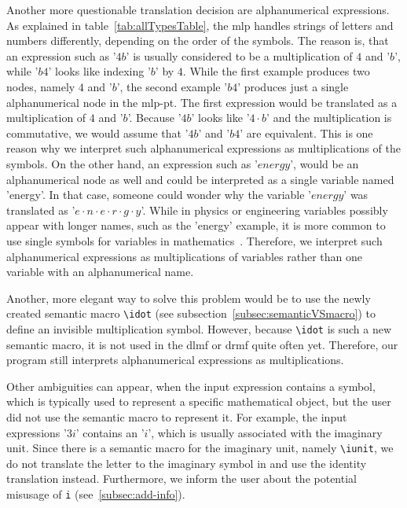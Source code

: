 Another more questionable translation decision are alphanumerical expressions. As explained in table~\ref{tab:allTypesTable}, the \gls{mlp} handles strings of letters and numbers differently, depending on the order of the symbols. The reason is, that an expression such as '$4b$' is usually considered to be a multiplication of $4$ and '$b$', while '$b4$' looks like indexing '$b$' by $4$. While the first example produces two nodes, namely $4$ and '$b$', the second example '$b4$' produces just a single alphanumerical node in the \gls{mlp-pt}. The first expression would be translated as a multiplication of $4$ and '$b$'. Because '$4b$' looks like '$4 \cdot b$' and the multiplication is commutative, we would assume that '$4b$' and '$b4$' are equivalent. This is one reason why we interpret such alphanumerical expressions as multiplications of the symbols. On the other hand, an expression such as '$energy$', would be an alphanumerical node as well and could be interpreted as a single variable named 'energy'. In that case, someone could wonder why the variable '$energy$' was translated as '$e \cdot n \cdot e \cdot r \cdot g \cdot y$'. While in physics or engineering variables possibly appear with longer names, such as the 'energy' example, it is more common to use single symbols for variables in mathematics~\parencite{Notation:History}. Therefore, we interpret such alphanumerical expressions as multiplications of variables rather than one variable with an alphanumerical name.

Another, more elegant way to solve this problem would be to use the newly created semantic macro \verb|\idot| (see subsection~\ref{subsec:semanticVSmacro}) to define an invisible multiplication symbol. However, because \verb|\idot| is such a new semantic macro, it is not used in the \gls{dlmf} or \gls{drmf} quite often yet. Therefore, our program still interprets alphanumerical expressions as multiplications.

Other ambiguities can appear, when the input expression contains a symbol, which is typically used to represent a specific mathematical object, but the user did not use the semantic macro to represent it. For example, the input expressions '$3i$' contains an '$i$', which is usually associated with the imaginary unit. Since there is a semantic macro for the imaginary unit, namely \verb|\iunit|, we do not translate the letter to the imaginary symbol in \Maple{} and use the identity translation instead. Furthermore, we inform the user about the potential misusage of \verb|i| (see~\ref{subsec:add-info}).

